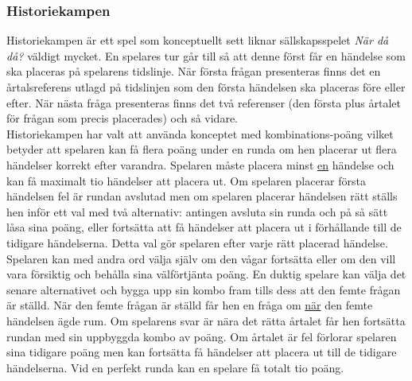 \documentclass[a4paper, 11pt]{article}
\begin{document}
\subsubsection{Historiekampen}
Historiekampen är ett spel som konceptuellt sett liknar sällskapsspelet \textit{När då då?} väldigt mycket. En spelares tur går till så att denne först får en händelse som ska placeras på spelarens tidslinje. När första frågan presenteras finns det en årtalsreferens utlagd på tidslinjen som den första händelsen ska placeras före eller efter. När nästa fråga presenteras finns det två referenser (den första plus årtalet för frågan som precis placerades) och så vidare.\\ 
Historiekampen har valt att använda konceptet med kombinations-poäng vilket betyder att spelaren kan få flera poäng under en runda om hen placerar ut flera händelser korrekt efter varandra. Spelaren måste placera minst \underline{en} händelse och kan få maximalt tio händelser att placera ut. Om spelaren placerar första händelsen fel är rundan avslutad men om spelaren placerar händelsen rätt ställs hen inför ett val med två alternativ: antingen avsluta sin runda och på så sätt låsa sina poäng, eller fortsätta att få händelser att placera ut i förhållande till de tidigare händelserna. Detta val gör spelaren efter varje rätt placerad händelse. Spelaren kan med andra ord välja själv om den vågar fortsätta eller om den vill vara försiktig och behålla sina välförtjänta poäng. En duktig spelare kan välja det senare alternativet och bygga upp sin kombo fram tills dess att den femte frågan är ställd. När den femte frågan är ställd får hen en fråga om \underline{när} den femte händelsen ägde rum. Om spelarens svar är nära det rätta årtalet får hen fortsätta rundan med sin uppbyggda kombo av poäng. Om årtalet är fel förlorar spelaren sina tidigare poäng men kan fortsätta få händelser att placera ut till de tidigare händelserna. Vid en perfekt runda kan en spelare få totalt tio poäng. 
\end{document}

